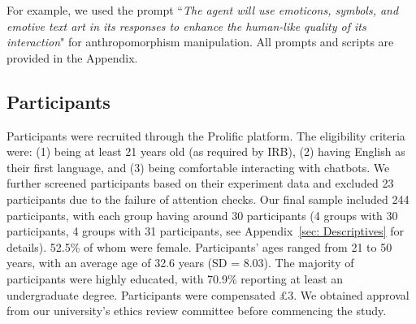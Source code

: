 For example, we used the prompt “\textit{The agent will use emoticons, symbols, and emotive text art in its responses to enhance the human-like quality of its interaction}" for anthropomorphism manipulation. 
All prompts and scripts are provided in the Appendix.


\subsection{Participants}

Participants were recruited through the Prolific platform. The eligibility criteria were: (1) being at least 21 years old (as required by IRB), (2) having English as their first language, and (3) being comfortable interacting with chatbots. We further screened participants based on their experiment data and excluded 23 participants due to the failure of attention checks. Our final sample included 244 participants, with each group having around 30 participants (4 groups with 30 participants, 4 groups with 31 participants, see Appendix~\ref{sec: Descriptives} for details). 52.5\% of whom were female. Participants’ ages ranged from 21 to 50 years, with an average age of 32.6 years (SD = 8.03). The majority of participants were highly educated, with 70.9\% reporting at least an undergraduate degree. Participants were compensated £3. We obtained approval from our university’s ethics review committee before commencing the study.






